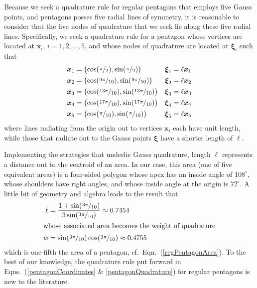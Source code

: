 Because we seek a quadrature rule for regular pentagons that employs five Gauss points, and pentagons posses five radial lines of symmetry, it is reasonable to consider that the five nodes of quadrature that we seek lie along these five radial lines.  Specifically, we seek a quadrature rule for a pentagon whose vertices are located at $\boldsymbol{x}_i$, $i=1,2,\ldots,5$, and whose nodes of quadrature are located at $\boldsymbol{\xi}_i$ such that
\begin{subequations}
    \label{pentagonCoordinates}
    \begin{align}
    \boldsymbol{x}_1 & = \bigl( \cos ( \textfrac{\pi}{2} ) ,
        \sin ( \textfrac{\pi}{2} ) \bigr) & \boldsymbol{\xi}_1 & = \ell \boldsymbol{x}_1 \\
    \boldsymbol{x}_2 & = \bigl( \cos ( \textfrac{9\pi}{10}) ,
    \sin ( \textfrac{9\pi}{10} ) \bigr) & \boldsymbol{\xi}_2 & = \ell \boldsymbol{x}_2 \\
    \boldsymbol{x}_3 & = \bigl( \cos ( \textfrac{13\pi}{10}) ,
    \sin ( \textfrac{13\pi}{10} ) \bigr) & \boldsymbol{\xi}_3 & = \ell \boldsymbol{x}_3 \\
    \boldsymbol{x}_4 & = \bigl( \cos ( \textfrac{17\pi}{10}) ,
    \sin ( \textfrac{17\pi}{10} ) \bigr) & \boldsymbol{\xi}_4 & = \ell \boldsymbol{x}_4 \\
    \boldsymbol{x}_5 & = \bigl( \cos ( \textfrac{\pi}{10}) ,
    \sin ( \textfrac{\pi}{10} ) \bigr) & \boldsymbol{\xi}_5 & = \ell \boldsymbol{x}_5
    \end{align}
\end{subequations}
where lines radiating from the origin out to vertices $\boldsymbol{x}_i$ each have unit length, while those that radiate out to the Gauss points $\boldsymbol{\xi}$ have a shorter length of $\ell$.

Implementing the strategies that underlie Gauss quadrature, length $\ell$ represents a distance out to the centroid of an area.  In our case, this area (one of five equivalent areas) is a four-sided polygon whose apex has an inside angle of $108^{\circ}$, whose shoulders have right angles, and whose inside angle at the origin is $72^{\circ}$.  A little bit of geometry and algebra leads to the result that
\begin{subequations}
    \label{pentagonQuadrature}
    \begin{align}
    \ell & = \frac{1 + \sin ( \textfrac{3\pi}{10} )}
    {3 \sin ( \textfrac{3\pi}{10} ) } \approx 0.7454 \\
    \intertext{whose associated area becomes the weight of quadrature}
    w & = \sin ( \textfrac{3\pi}{10} ) \cos ( \textfrac{3\pi}{10} ) 
    \approx 0.4755 
    \end{align}
\end{subequations}
which is one-fifth the area of a pentagon, cf.\ Eqn.~(\ref{regPentagonArea}).  To the best of our knowledge, the quadrature rule put forward in Eqns.~(\ref{pentagonCoordinates} \& \ref{pentagonQuadrature}) for regular pentagons is new to the literature. 

